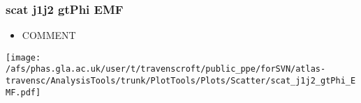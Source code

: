 \documentclass{beamer}
\begin{document}
\begin{frame}
\frametitle{scat j1j2 gtPhi EMF}
\begin{itemize}
\item COMMENT
\end{itemize}
\begin{center}
\texttt{[image: /afs/phas.gla.ac.uk/user/t/travenscroft/public\_ppe/forSVN/atlas-travensc/AnalysisTools/trunk/PlotTools/Plots/Scatter/scat\_j1j2\_gtPhi\_EMF.pdf]}
\end{center}
\end{frame}
\end{document}
